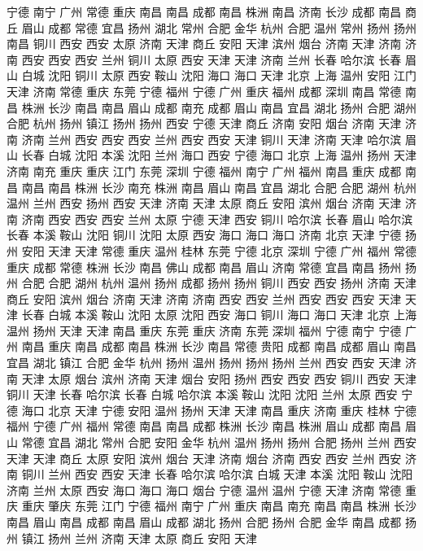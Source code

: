 宁德
南宁
广州
常德
重庆
南昌
南昌
成都
南昌
株洲
南昌
济南
长沙
成都
南昌
商丘
眉山
成都
常德
宜昌
扬州
湖北
常州
合肥
金华
杭州
合肥
温州
常州
扬州
扬州
南昌
铜川
西安
西安
太原
济南
天津
商丘
安阳
天津
滨州
烟台
济南
天津
济南
济南
西安
西安
西安
兰州
铜川
太原
西安
天津
天津
济南
兰州
长春
哈尔滨
长春
眉山
白城
沈阳
铜川
太原
西安
鞍山
沈阳
海口
海口
天津
北京
上海
温州
安阳
江门
天津
济南
常德
重庆
东莞
宁德
福州
宁德
广州
重庆
福州
成都
深圳
南昌
常德
南昌
株洲
长沙
南昌
南昌
眉山
成都
南充
成都
眉山
南昌
宜昌
湖北
扬州
合肥
湖州
合肥
杭州
扬州
镇江
扬州
扬州
西安
宁德
天津
商丘
济南
安阳
烟台
济南
天津
济南
济南
兰州
西安
西安
西安
兰州
西安
西安
天津
铜川
天津
济南
天津
哈尔滨
眉山
长春
白城
沈阳
本溪
沈阳
兰州
海口
西安
宁德
海口
北京
上海
温州
扬州
天津
济南
南充
重庆
重庆
江门
东莞
深圳
宁德
福州
南宁
广州
福州
南昌
重庆
成都
南昌
南昌
南昌
株洲
长沙
南充
株洲
南昌
眉山
南昌
宜昌
湖北
合肥
合肥
湖州
杭州
温州
兰州
西安
扬州
西安
天津
济南
天津
太原
商丘
安阳
滨州
烟台
济南
天津
济南
济南
西安
西安
西安
兰州
太原
宁德
天津
西安
铜川
哈尔滨
长春
眉山
哈尔滨
长春
本溪
鞍山
沈阳
铜川
沈阳
太原
西安
海口
海口
海口
济南
北京
天津
宁德
扬州
安阳
天津
天津
常德
重庆
温州
桂林
东莞
宁德
北京
深圳
宁德
广州
福州
常德
重庆
成都
常德
株洲
长沙
南昌
佛山
成都
南昌
眉山
济南
常德
宜昌
南昌
扬州
扬州
合肥
合肥
湖州
杭州
温州
扬州
成都
扬州
扬州
铜川
西安
西安
扬州
济南
天津
商丘
安阳
滨州
烟台
济南
天津
济南
济南
西安
西安
兰州
西安
西安
西安
天津
天津
长春
白城
本溪
鞍山
沈阳
太原
沈阳
西安
海口
铜川
海口
海口
天津
北京
上海
温州
扬州
天津
天津
南昌
重庆
东莞
重庆
济南
东莞
深圳
福州
宁德
南宁
宁德
广州
南昌
重庆
南昌
成都
南昌
株洲
长沙
南昌
常德
贵阳
成都
南昌
成都
眉山
南昌
宜昌
湖北
镇江
合肥
金华
杭州
扬州
温州
扬州
扬州
扬州
兰州
西安
西安
天津
济南
天津
太原
烟台
滨州
济南
天津
烟台
安阳
扬州
西安
西安
西安
铜川
西安
天津
铜川
天津
长春
哈尔滨
长春
白城
哈尔滨
本溪
鞍山
沈阳
沈阳
兰州
太原
西安
宁德
海口
北京
天津
宁德
安阳
温州
扬州
天津
天津
南昌
重庆
济南
重庆
桂林
宁德
福州
宁德
广州
福州
常德
南昌
南昌
成都
株洲
长沙
南昌
株洲
眉山
成都
南昌
眉山
常德
宜昌
湖北
常州
合肥
安阳
金华
杭州
温州
扬州
扬州
合肥
扬州
兰州
西安
天津
天津
商丘
太原
安阳
滨州
烟台
天津
济南
烟台
济南
西安
西安
兰州
西安
济南
铜川
兰州
西安
西安
天津
长春
哈尔滨
哈尔滨
白城
天津
本溪
沈阳
鞍山
沈阳
济南
兰州
太原
西安
海口
海口
海口
烟台
宁德
温州
温州
宁德
天津
济南
常德
重庆
重庆
肇庆
东莞
江门
宁德
福州
南宁
广州
重庆
南昌
南充
南昌
南昌
株洲
长沙
南昌
眉山
南昌
成都
南昌
眉山
成都
湖北
扬州
合肥
扬州
合肥
金华
南昌
成都
扬州
镇江
扬州
兰州
济南
天津
太原
商丘
安阳
天津
